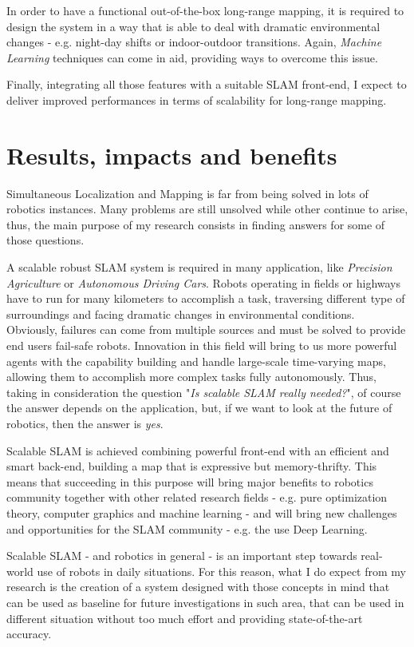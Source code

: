 \documentclass[10pt,a4paper, notitlepage]{report}
\begin{document}
In order to have a functional out-of-the-box long-range mapping, it is required to design the system in a way that is able to deal with dramatic environmental changes - e.g. night-day shifts or indoor-outdoor transitions. Again, \textit{Machine Learning} techniques can come in aid, providing ways to overcome this issue.

Finally, integrating all those features with a suitable SLAM front-end, I expect to deliver improved performances in terms of scalability for long-range mapping.

\section*{Results, impacts and benefits}
Simultaneous Localization and Mapping is far from being solved in lots of robotics instances. Many problems are still unsolved while other continue to arise, thus, the main purpose of my research consists in finding answers for some of those questions. 

A scalable robust SLAM system is required in many application, like \textit{Precision Agriculture} or \textit{Autonomous Driving Cars}. Robots operating in fields or highways have to run for many kilometers to accomplish a task, traversing different type of surroundings and facing dramatic changes in environmental conditions. Obviously, failures can come from multiple sources and must be solved to provide end users fail-safe robots. Innovation in this field will bring to us more powerful agents with the capability building and handle large-scale time-varying maps, allowing them to accomplish more complex tasks fully autonomously. Thus, taking in consideration the question "\textit{Is scalable SLAM really needed?}", of course the answer depends on the application, but, if we want to look at the future of robotics, then the answer is \textit{yes}.

Scalable SLAM is achieved combining powerful front-end with an efficient and smart back-end, building a map that is expressive but memory-thrifty. This means that succeeding in this purpose will bring major benefits to robotics community together with other related research fields - e.g. pure optimization theory, computer graphics and machine learning -  and will bring new challenges and opportunities for the SLAM community - e.g. the use Deep Learning. 

\vspace{10px}

Scalable SLAM - and robotics in general - is an important step towards real-world use of robots in daily situations. For this reason, what I do expect from my research is the creation of a system designed with those concepts in mind that can be used as baseline for future investigations in such area, that can be used in different situation without too much effort and providing state-of-the-art accuracy.






\end{document}
